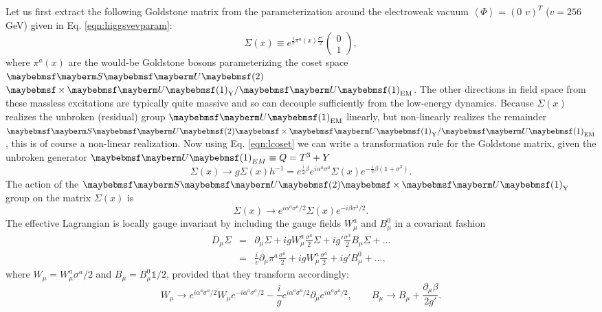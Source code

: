 Let us first extract the following Goldstone matrix from the parameterization around the electroweak vacuum $\left\langle \Phi \right\rangle = (0 \,\, v)^{T}$ ($v=256$ GeV) given in Eq. \ref{eqn:higgsvevparam}:
\begin{equation}
\Sigma(x) \equiv e^{\frac{i}{v}\pi^a(x) \frac{\sigma^a}{2}} 
\begin{pmatrix} 
0 \\
1 
\end{pmatrix},
\end{equation}
where $\pi^a(x)$ are the would-be Goldstone bosons parameterizing the coset space $\SUgroup{2}$ \newline $\times \Ugroup{1}_{\text{Y}}/\Ugroup{1}_{\text{EM}}$. The other directions in field space from these massless excitations are typically quite massive and so can decouple sufficiently from the low-energy dynamics. Because $\Sigma(x)$ realizes the unbroken (residual) group $\Ugroup{1}_{\text{EM}}$ linearly, but non-linearly realizes the remainder $\SUgroup{2} \times \Ugroup{1}_{\text{Y}}/\Ugroup{1}_{\text{EM}}$, this is of course a non-linear realization. Now using Eq. \ref{eqn:lcoset} we can write a transformation rule for the Goldstone matrix, given the unbroken generator $\Ugroup{1}_{EM} \equiv Q=T^3 + Y$
\begin{equation}
\Sigma(x) \rightarrow g \Sigma(x) h^{-1} = e^{\frac{i}{2}\beta}e^{i\alpha^a \sigma^a} \Sigma(x) e^{-\frac{i}{2}\beta (\mathbb{1}+\sigma^3)}.
\end{equation}
The action of the $\SUgroup{2} \times \Ugroup{1}_{\text{Y}}$ group on the matrix $\Sigma(x)$ is
\begin{equation}
\Sigma(x) \rightarrow e^{i\alpha^a \sigma^a/2}\Sigma(x)e^{-i\beta \sigma^3/2}.
\end{equation}
The effective Lagrangian is locally gauge invariant by including the gauge fields $W^a_{\mu}$ and $B^0_{\mu}$ in a covariant fashion
\begin{eqnarray}
D_{\mu} \Sigma &=& \partial_{\mu} \Sigma +i g W^a_{\mu} \frac{\sigma^a}{2} \Sigma + i g' \frac{\sigma^3}{2} B_{\mu} \Sigma + ... \\
&=& \frac{i}{v}\partial_{\mu} \pi^a \frac{\sigma^a}{2} + i g W^a_{\mu} \frac{\sigma^a}{2} + i g' B^0_{\mu} + ...,
\end{eqnarray}
where $W_{\mu}=W^a_{\mu}\sigma^a/2$ and $B_{\mu}=B^0_{\mu}\mathbb{1}/2$, provided that they transform accordingly:
\begin{equation}
W_{\mu} \rightarrow e^{i\alpha^a \sigma^a/2} W_{\mu} e^{-i\alpha^a \sigma^a/2} - \frac{i}{g}e^{i\alpha^a \sigma^a/2}\partial_{\mu} e^{i\alpha^a \sigma^a/2},\qquad B_{\mu} \rightarrow B_{\mu} + \frac{\partial_{\mu}\beta}{2 g'}.
\end{equation}

